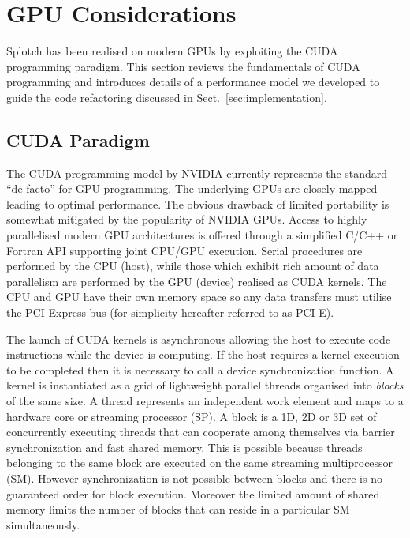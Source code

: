 \documentclass[preprint,5pt]{elsarticle}
\begin{document}
\section{GPU Considerations}
\label{sec:gpu-code}

Splotch has been realised on modern GPUs by exploiting the CUDA programming paradigm. This section reviews the fundamentals of CUDA programming and introduces details of a performance model we developed to guide the code refactoring discussed in Sect.~\ref{sec:implementation}.  

\subsection{CUDA Paradigm} 
\label{sec:cuda}

The CUDA programming model \cite{cudaurl} by NVIDIA currently represents the standard ``de facto'' for GPU programming. The underlying GPUs are closely mapped leading to optimal performance. The obvious drawback of limited portability is somewhat mitigated by the popularity of NVIDIA GPUs. Access to highly parallelised modern GPU architectures is offered through a simplified C/C++ or Fortran API supporting joint CPU/GPU execution. Serial procedures are performed by the CPU (host), while those which exhibit rich amount of data parallelism are performed by the GPU (device) realised as CUDA kernels. The CPU and GPU have their own memory space so any data transfers must utilise the PCI Express bus (for simplicity hereafter referred to as PCI-E).

The launch of CUDA kernels is asynchronous allowing the host to execute code instructions while the device is computing. If the host requires a kernel execution to be completed then it is necessary to call a device synchronization function. A kernel is instantiated as a grid of lightweight parallel threads organised into {\em blocks} of the same size. A thread represents an independent work element and maps to a hardware core or streaming processor (SP). A block is a 1D, 2D or 3D set of concurrently executing threads that can cooperate among themselves via barrier synchronization and fast shared memory. This is possible because threads belonging to the same block are executed on the same streaming multiprocessor (SM). However synchronization is not possible between blocks and there is no guaranteed order for block execution. Moreover the limited amount of shared memory limits the number of  blocks that can reside in a particular SM simultaneously.  
\end{document}
